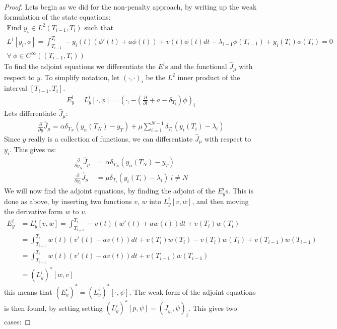 \begin{proof}
Lets begin as we did for the non-penalty approach, by writing up the weak formulation of the state equations:
\begin{gather*}
\textrm{Find $y_i \in L^2(T_{i-1},T_i)$ such that }\\
L^i[y_i,\phi] = \int_{T_{i-1}}^{T_{i}}-y_i(t)(\phi'(t) +a \phi(t))+v(t)\phi(t)dt -\lambda_{i-1}\phi(T_{i-1})+ y_i(T_i)\phi(T_i) =0\\ \forall \ \phi \in C^{\infty}((T_{i-1},T_{i}))
\end{gather*} 
To find the adjoint equations we differentiate the $E^i$s and the functional $\hat J_{\mu}$ with respect to $y$. To simplify notation, let $(\cdot,\cdot)_i$ be the $L^2$ inner product of the interval $[T_{i-1},T_i]$. 
\begin{align*}
E_y^i=L_y^i[\cdot,\phi]=(\cdot,-(\frac{\partial}{\partial t} + a - \delta_{T_i})\phi)_i 
\end{align*}
Lets differentiate $\hat J_{\mu}$:
\begin{align*}
\frac{\partial}{\partial y} \hat J_{\mu}= \alpha\delta_{T_{N}}(y_n(T_{N})-y_T) + \mu \sum_{i=1}^{N-1} \delta_{T_{i}}(y_{i}(T_i)-\lambda_i ) 
\end{align*}
Since $y$ really is a collection of functions, we can differentiate $\hat J_{\mu}$ with respect to $y_i$. This gives us:
\begin{align*}
\frac{\partial}{\partial y_N}\hat J_{\mu}&= \alpha\delta_{T_{N}}(y_n(T_{N})-y_T) \\
\frac{\partial}{\partial y_i}\hat J_{\mu} &= \mu\delta_{T_{i}}(y_{i}(T_i)-\lambda_i ) \ i\neq N
\end{align*}
We will now find the adjoint equations, by finding the adjoint of the $E_y^i$s. This is done as above, by inserting two functions $v$, $w$ into $L_y^i[v,w]$, and then moving the derivative form $w$ to $v$.
\begin{align*}
E_y^i&=L_y^i[v,w]=\int_{T_{i-1}}^{T_i}-v(t)(w'(t)+a w(t))dt + v(T_i)w(T_i) \\
&=\int_{T_{i-1}}^{T_i}w(t)(v'(t)-av(t))dt + v(T_i)w(T_i)-v(T_i)w(T_i) +v(T_{i-1})w(T_{i-1}) \\
&=\int_{T_{i-1}}^{T_i}w(t)(v'(t)-a v(t))dt + v(T_{i-1})w(T_{i-1}) \\
&=(L_y^i)^*[w,v]
\end{align*}
this means that $(E_y^i)^*=(L_y^i)^*[\cdot,\psi]$. The weak form of the adjoint equations is then found, by setting setting $(L_y^i)^*[p,\psi]=(J_{y_i},\psi)_i$. This gives two cases:

\end{proof}
